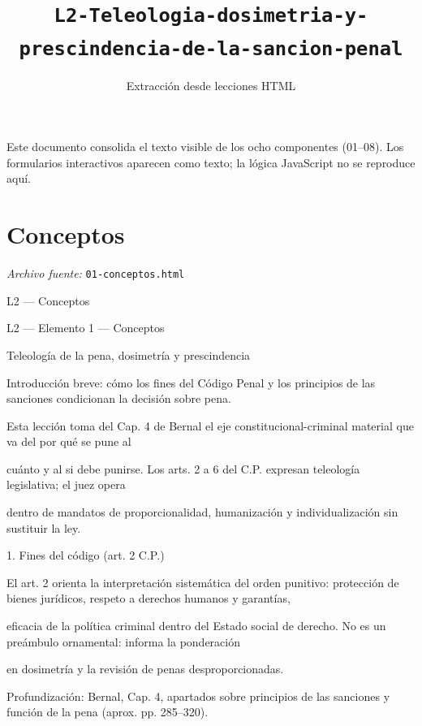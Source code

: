 \documentclass[11pt,a4paper]{article}
\title{\texttt{L2-Teleologia-dosimetria-y-prescindencia-de-la-sancion-penal}}
\author{Extracci\'on desde lecciones HTML}
\date{}
\begin{document}
\maketitle

\begin{small}
\noindent Este documento consolida el texto visible de los ocho componentes (01--08). Los formularios interactivos aparecen como texto; la l\'ogica JavaScript no se reproduce aqu\'i.
\end{small}
\bigskip
\section{Conceptos}
\noindent\textit{Archivo fuente:} \texttt{01-conceptos.html}

L2 — Conceptos\par





    L2 — Elemento 1 — Conceptos\par
    Teleología de la pena, dosimetría y prescindencia\par

    Introducción breve: cómo los fines del Código Penal y los principios de las sanciones condicionan la decisión sobre pena.\par


      Esta lección toma del Cap. 4 de Bernal el eje constitucional-criminal material que va del por qué se pune al\par
      cuánto y al si debe punirse. Los arts. 2 a 6 del C.P. expresan teleología legislativa; el juez opera\par
      dentro de mandatos de proporcionalidad, humanización y individualización sin sustituir la ley.\par



      1. Fines del código (art. 2 C.P.)\par


        El art. 2 orienta la interpretación sistemática del orden punitivo: protección de bienes jurídicos, respeto a derechos humanos y garantías,\par
        eficacia de la política criminal dentro del Estado social de derecho. No es un preámbulo ornamental: informa la ponderación\par
        en dosimetría y la revisión de penas desproporcionadas.\par


      Profundización: Bernal, Cap. 4, apartados sobre principios de las sanciones y función de la pena (aprox. pp. 285–320).\par
\end{document}
